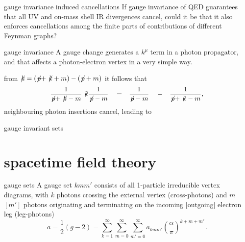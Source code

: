 \begin{frame}{gauge invariance induced cancellations}
If gauge invariance of QED guarantees that all UV and on-mass shell IR
divergences cancel, could it be that it also enforces cancellations among
the finite parts of contributions of different Feynman graphs?
\end{frame}

\begin{frame}{gauge invariance}
A gauge change generates a $k^\mu$ term in a photon propagator,
 and that affects a photon-electron vertex in a very simple way.

\medskip
from \(
\not\!{k} = (\not\!{p}+\not\!{k}+m) - (\not\!{p}+m)
\)
it follows that
\begin{align}
  \begin{tabular}{ccccc}
$\!{\begin{aligned}\frac{1}{\not\!{p}+\not\!{k}-m}\not\!{k}\frac{1}{\not\!{p}-m}\end{aligned}}$ &
$=$ &    $\!{\begin{aligned}\frac{1}{\not\!{p}-m}\end{aligned}}$ &
$-$ &    $\!{\begin{aligned}\frac{1}{\not\!{p}+\not\!{k}-m},\end{aligned}}$
  \end{tabular}
  \nnu %
\end{align}
neighbouring photon insertions cancel, leading to

\vfill\hfill \textcolor{blue!90!black}{gauge invariant sets}
\end{frame}

\section[spacetime field theory]
 {spacetime field theory}
\label{spacetimeFT}

\begin{frame}{gauge sets}
A gauge set $kmm'$ consists of all 1-particle irreducible vertex
diagrams, with $k$ photons crossing the external
vertex (cross-photons) and $m$ $[m']$ photons originating and terminating
on the incoming [outgoing] electron leg (leg-photons)
\[ %
a=\frac{1}{2}(g-2)
       =  \sum_{k=1}^\infty\sum_{m=0}^\infty\sum_{m'=0}^\infty
          a_{kmm'}\left(\frac{\alpha}{\pi}\right)^{k+m+m'}
\,.
\] %
\end{frame}


